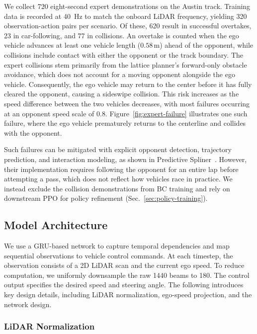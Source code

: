 \documentclass[letterpaper,10 pt,conference]{ieeeconf}
\begin{document}
We collect 720 eight-second expert demonstrations on the Austin track. Training data is recorded at 40~Hz to match the onboard LiDAR frequency, yielding 320 observation-action pairs per scenario. Of these, 620 result in successful overtakes, 23 in car-following, and 77 in collisions. An overtake is counted when the ego vehicle advances at least one vehicle length ($0.58\,\text{m}$) ahead of the opponent, while collisions include contact with either the opponent or the track boundary. The expert collisions stem primarily from the lattice planner's forward-only obstacle avoidance, which does not account for a moving opponent alongside the ego vehicle. Consequently, the ego vehicle may return to the center before it has fully cleared the opponent, causing a sideswipe collision. This risk increases as the speed difference between the two vehicles decreases, with most failures occurring at an opponent speed scale of 0.8. Figure~\ref{fig:expert-failure} illustrates one such failure, where the ego vehicle prematurely returns to the centerline and collides with the opponent.

Such failures can be mitigated with explicit opponent detection, trajectory prediction, and interaction modeling, as shown in Predictive Spliner~\cite{baumann2025predictive}. However, their implementation requires following the opponent for an entire lap before attempting a pass, which does not reflect how vehicles race in practice. We instead exclude the collision demonstrations from BC training and rely on downstream PPO for policy refinement (Sec.~\ref{sec:policy-training}).

\subsection{Model Architecture}

We use a GRU-based network to capture temporal dependencies and map sequential observations to vehicle control commands.
At each timestep, the observation consists of a 2D LiDAR scan and the current ego speed.
To reduce computation, we uniformly downsample the raw 1440 beams to 180.
The control output specifies the desired speed and steering angle.
The following introduces key design details, including LiDAR normalization, ego-speed projection, and the network design.

\subsubsection{LiDAR Normalization}
\end{document}
